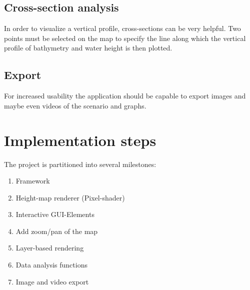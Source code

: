 \documentclass[paper=a4]{proc}
\begin{document}
			\subsection*{Cross-section analysis}
				In order to visualize a vertical profile, cross-sections can be very helpful. Two points must be selected on the map to specify the line along which the vertical profile of bathymetry and water height is then plotted.
		\subsection{Export}
			For increased usability the application should be capable to export images and maybe even videos of the scenario and graphs.
	\section{Implementation steps}
		The project is partitioned into several milestones:
		\begin{enumerate}
			\item Framework
			\item Height-map renderer (Pixel-shader)
			\item Interactive GUI-Elements
			\item Add zoom/pan of the map
			\item Layer-based rendering
			\item Data analysis functions
			\item Image and video export
		\end{enumerate}
\end{document}
